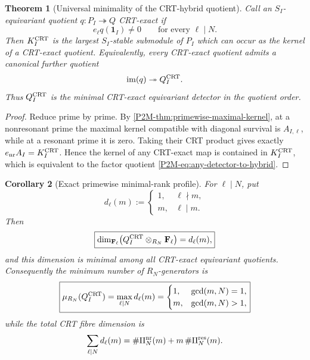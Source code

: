 \documentclass[11pt]{article}
\newtheorem{theorem}{Theorem}[section]
\newtheorem{corollary}[theorem]{Corollary}
\theoremstyle{remark}
\begin{document}
\begin{theorem}[Universal minimality of the CRT-hybrid quotient]
\label{P2M-thm:crt-hybrid-universal-minimality}
Call an \(S_I\)-equivariant quotient
\(q:P_I\twoheadrightarrow Q\) \emph{CRT-exact} if
\begin{equation}
 e_\ell q(\mathbf1_I)\ne0
 \qquad\text{for every }\ell\mid N.
\end{equation}
Then \(K_I^{\rm CRT}\) is the largest \(S_I\)-stable submodule of \(P_I\)
which can occur as the kernel of a CRT-exact quotient.  Equivalently, every
CRT-exact quotient admits a canonical further quotient
\begin{equation}\label{P2M-eq:any-detector-to-hybrid}
 \operatorname{im}(q)\twoheadrightarrow Q_I^{\rm CRT}.
\end{equation}
Thus \(Q_I^{\rm CRT}\) is the minimal CRT-exact equivariant detector in the
quotient order.
\end{theorem}

\begin{proof}
Reduce prime by prime.  By
\cref{P2M-thm:primewise-maximal-kernel}, at a nonresonant prime the maximal kernel
compatible with diagonal survival is \(A_{I,\ell}\), while at a resonant prime
it is zero.  Taking their CRT product gives exactly
\(e_{\rm nr}A_I=K_I^{\rm CRT}\).  Hence the kernel of any CRT-exact map is
contained in \(K_I^{\rm CRT}\), which is equivalent to the factor quotient
\eqref{P2M-eq:any-detector-to-hybrid}.
\end{proof}

\begin{corollary}[Exact primewise minimal-rank profile]
\label{P2M-cor:crt-primewise-minimal-rank}
For \(\ell\mid N\), put
\begin{equation}\label{P2M-eq:primewise-rank-profile}
 d_\ell(m):=
 \begin{cases}
  1,&\ell\nmid m,\\
  m,&\ell\mid m.
 \end{cases}
\end{equation}
Then
\begin{equation}
 \boxed{
 \dim_{\mathbf F_\ell}
 \bigl(Q_I^{\rm CRT}\otimes_{R_N}\mathbf F_\ell\bigr)
 =d_\ell(m),}
\end{equation}
and this dimension is minimal among all CRT-exact equivariant quotients.
Consequently the minimum number of \(R_N\)-generators is
\begin{equation}\label{P2M-eq:hybrid-global-generator-number}
 \boxed{
 \mu_{R_N}(Q_I^{\rm CRT})
 =\max_{\ell\mid N}d_\ell(m)
 =
 \begin{cases}
  1,&\gcd(m,N)=1,\\
  m,&\gcd(m,N)>1,
 \end{cases}}
\end{equation}
while the total CRT fibre dimension is
\begin{equation}
 \sum_{\ell\mid N}d_\ell(m)
 =\#\Pi_N^{\rm nr}(m)+m\,\#\Pi_N^{\rm res}(m).
\end{equation}
\end{corollary}
\end{document}
